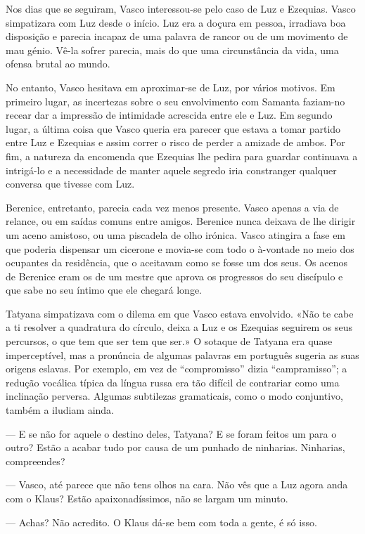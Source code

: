 Nos dias que se seguiram, Vasco interessou-se pelo caso de Luz e
Ezequias. Vasco simpatizara com Luz desde o início. Luz era a doçura em
pessoa, irradiava boa disposição e parecia incapaz de uma palavra de
rancor ou de um movimento de mau génio. Vê-la sofrer parecia, mais do
que uma circunstância da vida, uma ofensa brutal ao mundo.

No entanto, Vasco hesitava em aproximar-se de Luz, por vários motivos.
Em primeiro lugar, as incertezas sobre o seu envolvimento com Samanta
faziam-no recear dar a impressão de intimidade acrescida entre ele e
Luz. Em segundo lugar, a última coisa que Vasco queria era parecer que
estava a tomar partido entre Luz e Ezequias e assim correr o risco de
perder a amizade de ambos. Por fim, a natureza da encomenda que Ezequias
lhe pedira para guardar continuava a intrigá-lo e a
necessidade de manter aquele segredo iria constranger qualquer conversa
que tivesse com Luz.

Berenice, entretanto, parecia cada vez menos presente. Vasco apenas a
via de relance, ou em saídas comuns entre amigos. Berenice nunca deixava
de lhe dirigir um aceno amistoso, ou uma piscadela de olho irónica.
Vasco atingira a fase em que poderia dispensar um cicerone e movia-se
com todo o à-vontade no meio dos ocupantes da residência, que o aceitavam como se fosse um dos seus. Os acenos de Berenice eram os de um
mestre que aprova os progressos do seu discípulo e que sabe no seu
íntimo que ele chegará longe.

Tatyana simpatizava com o dilema em que Vasco estava envolvido. «Não te
cabe a ti resolver a quadratura do círculo, deixa a Luz e os Ezequias
seguirem os seus percursos, o que tem que ser tem que ser.» O sotaque de
Tatyana era quase imperceptível, mas a pronúncia de algumas palavras em
português sugeria as suas origens eslavas. Por exemplo, em vez de
``compromisso'' dizia ``campramisso''; a redução vocálica típica da
língua russa era tão difícil de contrariar como uma inclinação perversa.
Algumas subtilezas gramaticais, como o modo conjuntivo, também a iludiam
ainda.

--- E se não for aquele o destino deles, Tatyana? E se foram feitos um
  para o outro? Estão a acabar tudo por causa de um punhado de
  ninharias. Ninharias, compreendes?

--- Vasco, até parece que não tens olhos na cara. Não vês que a Luz agora
  anda com o Klaus? Estão apaixonadíssimos, não se largam um minuto.

--- Achas? Não acredito. O Klaus dá-se bem com toda a gente, é só isso.


